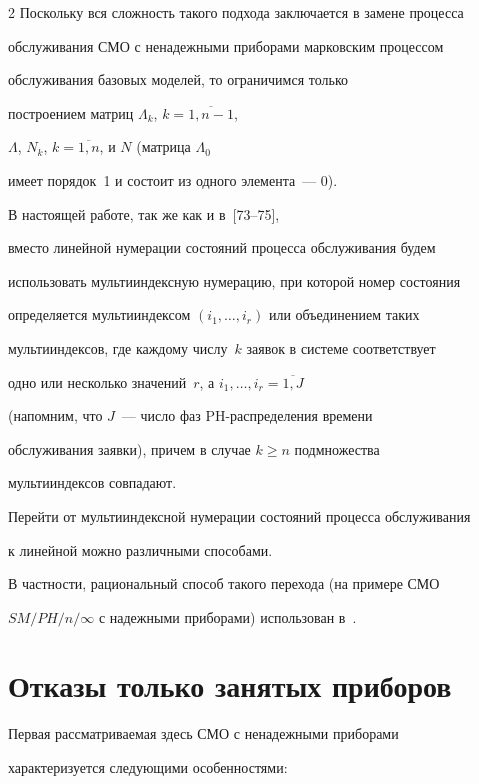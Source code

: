 \begin{multicols}{2}
Поскольку вся сложность такого подхода заключается в замене процесса


обслуживания СМО с ненадежными приборами марковским процессом


обслуживания базовых моделей, то ограничимся только


построением матриц $\Lambda_k$, $k=\overline{1,n-1}$,


$\Lambda$, $N_k$, $k=\overline{1,n}$, и $N$ (матрица $\Lambda_0$


имеет порядок~1 и состоит из одного элемента~--- 0).





В настоящей работе, так же как и в~[73--75],


вмес\-то линейной нумерации состояний процесса обслуживания будем


использовать мультииндексную нумерацию, при которой номер состояния


определяется мультииндексом $(i_1,\ldots,i_r)$ или объединением таких


мультииндексов, где каждому чис\-лу~$k$ заявок в системе соответствует


одно или несколько значений~$r$, а $i_1,\ldots,i_r=\overline{1,J}$


(напомним, что $J$~--- чис\-ло фаз PH-распределения времени


обслуживания заявки), причем в случае $k\ge n$ подмножества


мультииндексов совпадают.


Перейти от мультииндексной нумерации состояний процесса обслуживания


к линейной можно различными способами.


В частности, рациональный способ такого перехода (на примере СМО


$SM/PH/n/\infty$ с надежными приборами) использован в~\cite{PC04,PC03}.





\section{Отказы только занятых приборов}





Первая рассматриваемая здесь СМО с ненадежными приборами


характеризуется следующими особенностями:



\end{multicols}
